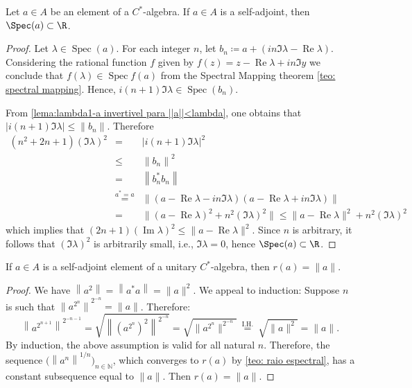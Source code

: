 \begin{lema}
\label{lema: a*=a --> Spec a real}
Let $a\in A$ be an element of a $C^*$-algebra. If $a\in A$ is a self-adjoint, then $\Spec(a) \subset \R$.
\end{lema}
\begin{proof}
Let $\lambda \in \operatorname{Spec} (a)$. For each integer $n$, let $b_{n}\coloneqq a+(i n \Im \lambda-\operatorname{Re}\lambda)$. Considering the rational function $f$ given by $f(z)=z-\operatorname{Re}\lambda+i n \Im y$ we conclude that $f(\lambda) \in \operatorname{Spec} f(a)$ from the Spectral Mapping theorem \ref{teo: spectral mapping}. Hence, $i(n+1) \Im \lambda \in \operatorname{Spec} (b_{n})$.

From \ref{lema:lambda1-a invertivel para ||a||<lambda}, one obtains that $|i(n+1) \Im \lambda| \leqslant\left\|b_{n}\right\|$. Therefore
$$
\begin{array}{rcl}
(n^{2}+2 n+1) (\Im \lambda)^{2} &= &|i(n+1) \Im \lambda|^{2} \\
& \leqslant &\left\|b_{n}\right\|^{2} \\
&= &\left\|b_{n}^{*} b_{n}\right\| \\
&\overset{a^*=a}=&\|(a-\operatorname{Re}\lambda-i n \Im \lambda)(a-\operatorname{Re}\lambda+i n \Im \lambda)\| \\
&=& \|(a-\operatorname{Re}\lambda)^{2}+n^{2} (\Im \lambda)^{2}\| \leqslant\|a-\operatorname{Re}\lambda\|^{2}+n^2(\Im \lambda)^{2}
\end{array}
$$
which implies that $(2 n+1) (\operatorname{Im}\lambda)^{2} \leqslant\|a-\operatorname{Re}\lambda\|^{2}$. Since $n$ is arbitrary, it follows that $(\Im \lambda)^2$ is arbitrarily small, i.e., $\Im \lambda=0$, hence $\Spec(a) \subset \R$.
\end{proof}


\begin{lema}
If $a \in A$ is a self-adjoint element of a unitary $C^{*}$-algebra, then $r(a)=\|a\|$.
\end{lema}\begin{proof}
We have $\left\|a^{2}\right\|=\left\|a^{*} a\right\|=\|a\|^{2}$. We appeal to induction: Suppose $n$ is such that ${\|a^{2^{n}}\|}^{2^{-n}}=\|a\| $. Therefore:
$$
\left\|a^{2^{n+1}}\right\|^{2^{-n-1}}=\sqrt{\left\|\left(a^{2^{n}} \right)^{2}\right\|^{2^{-n}}}=\sqrt{\| a^{2^{n}} \|^{2^{-n}}} \stackrel{\text { I.H. }}{=} \sqrt{\|a\|^{2}}=\|a\|.
$$
By induction, the above assumption is valid for all natural $n$. Therefore, the sequence $\big(\left\|a^{n}\right\|^{1 / n}\big)_{n \in \mathbb{N}}$, which converges to $r(a)$ by \ref{teo: raio espectral}, has a constant subsequence equal to $\|a\|$. Then $r(a)=\|a\|$.
\end{proof}

